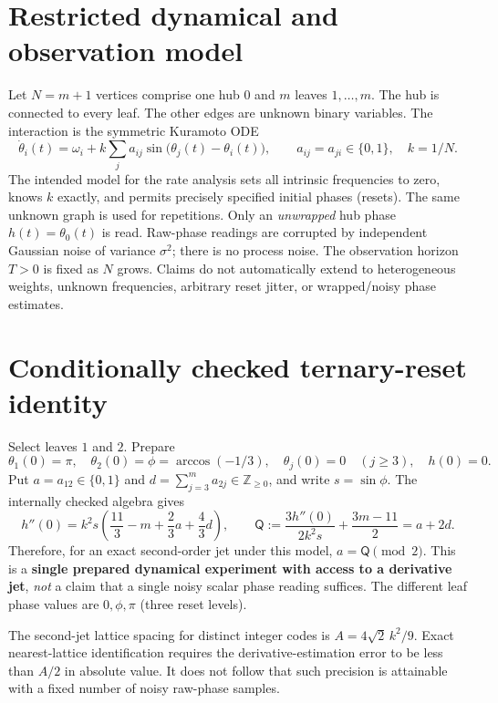 \documentclass[11pt,a4paper]{article}
\newcommand{\code}{\mathsf{Q}}
\begin{document}
\section{Restricted dynamical and observation model}
Let $N=m+1$ vertices comprise one hub $0$ and $m$ leaves $1,\ldots,m$. The hub is connected to every leaf. The other edges are unknown binary variables. The interaction is the symmetric Kuramoto ODE
\begin{equation}
\dot\theta_i(t)=\omega_i + k\sum_{j} a_{ij}\sin\bigl(\theta_j(t)-\theta_i(t)\bigr),\qquad a_{ij}=a_{ji}\in\{0,1\},\quad k=1/N.
\label{eq:kuramoto}
\end{equation}
The intended model for the rate analysis sets all intrinsic frequencies to zero, knows $k$ exactly, and permits precisely specified initial phases (resets). The same unknown graph is used for repetitions. Only an \emph{unwrapped} hub phase $h(t)=\theta_0(t)$ is read. Raw-phase readings are corrupted by independent Gaussian noise of variance $\sigma^2$; there is no process noise. The observation horizon $T>0$ is fixed as $N$ grows. Claims do not automatically extend to heterogeneous weights, unknown frequencies, arbitrary reset jitter, or wrapped/noisy phase estimates.
\section{Conditionally checked ternary-reset identity}
Select leaves $1$ and $2$. Prepare
\begin{equation}
\theta_1(0)=\pi,\quad \theta_2(0)=\phi=\arccos(-1/3),\quad \theta_j(0)=0\quad(j\ge3),\quad h(0)=0.
\end{equation}
Put $a=a_{12}\in\{0,1\}$ and $d=\sum_{j=3}^{m}a_{2j}\in\mathbb{Z}_{\ge0}$, and write $s=\sin\phi$. The internally checked algebra gives
\begin{equation}
 h''(0)=k^2s\left(\frac{11}{3}-m+\frac{2}{3}a+\frac{4}{3}d\right),
 \qquad
 \code:=\frac{3h''(0)}{2k^2s}+\frac{3m-11}{2}=a+2d.
 \label{eq:code}
\end{equation}
Therefore, for an exact second-order jet under this model, $a=\code\pmod2$. This is a \textbf{single prepared dynamical experiment with access to a derivative jet}, \emph{not} a claim that a single noisy scalar phase reading suffices. The different leaf phase values are $0,\phi,\pi$ (three reset levels).

The second-jet lattice spacing for distinct integer codes is $A=4\sqrt{2}\,k^2/9$. Exact nearest-lattice identification requires the derivative-estimation error to be less than $A/2$ in absolute value. It does not follow that such precision is attainable with a fixed number of noisy raw-phase samples.
\end{document}
